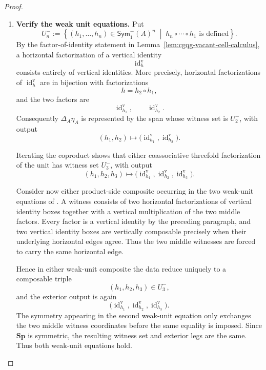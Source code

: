 \documentclass[oneside]{article}
\newcommand{\Sym}{\mathsf{Sym}}
\newcommand{\Sp}{\mathbf{Sp}}
\newcommand{\id}{\operatorname{id}}
\theoremstyle{plain}
\theoremstyle{definition}
\theoremstyle{remark}
\begin{document}
\begin{proof}
\begin{enumerate}[beginpenalty=10000]
        \item \textbf{Verify the weak unit equations.}
        Put
        \[
            U^-_n
            :=
            \left\{
                (h_1,\ldots,h_n)
                \in\Sym^-_1(A)^n
                \;\middle|\;
                h_n\circ\cdots\circ h_1
                \text{ is defined}
            \right\}.
        \]
        By the factor-of-identity statement in
        Lemma~\ref{lem:cgqg-vacant-cell-calculus}, a horizontal
        factorization of a vertical identity
        \[
            \id_h^{\mathrm v}
        \]
        consists entirely of vertical identities. More precisely,
        horizontal factorizations of \(\id_h^{\mathrm v}\) are in
        bijection with factorizations
        \[
            h=h_2\circ h_1,
        \]
        and the two factors are
        \[
            \id_{h_1}^{\mathrm v},
            \qquad
            \id_{h_2}^{\mathrm v}.
        \]
        Consequently \(\Delta_A\eta_A\) is represented by the span whose
        witness set is \(U^-_2\), with output
        \[
            (h_1,h_2)
            \longmapsto
            \bigl(
                \id_{h_1}^{\mathrm v},
                \id_{h_2}^{\mathrm v}
            \bigr).
        \]

        Iterating the coproduct shows that either coassociative
        threefold factorization of the unit has witness set \(U^-_3\),
        with output
        \[
            (h_1,h_2,h_3)
            \longmapsto
            \bigl(
                \id_{h_1}^{\mathrm v},
                \id_{h_2}^{\mathrm v},
                \id_{h_3}^{\mathrm v}
            \bigr).
        \]

        Consider now either product-side composite occurring in the two
        weak-unit equations of
        \cite[Def.~1.1]{PastroStreet2009}. A witness consists of two
        horizontal factorizations of vertical identity boxes together
        with a vertical multiplication of the two middle factors.
        Every factor is a vertical identity by the preceding paragraph,
        and two vertical identity boxes are vertically composable
        precisely when their underlying horizontal edges agree. Thus
        the two middle witnesses are forced to carry the same horizontal
        edge.

        Hence in either weak-unit composite the data reduce uniquely to
        a composable triple
        \[
            (h_1,h_2,h_3)\in U^-_3,
        \]
        and the exterior output is again
        \[
            \bigl(
                \id_{h_1}^{\mathrm v},
                \id_{h_2}^{\mathrm v},
                \id_{h_3}^{\mathrm v}
            \bigr).
        \]
        The symmetry appearing in the second weak-unit equation only
        exchanges the two middle witness coordinates before the same
        equality is imposed. Since \(\Sp\) is symmetric, the resulting
        witness set and exterior legs are the same. Thus both weak-unit
        equations hold.


\end{enumerate}
\end{proof}
\end{document}
